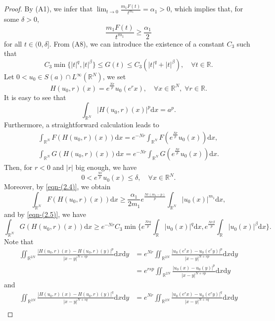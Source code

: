 \documentclass[10pt,a4paper]{amsart}
\numberwithin{equation}{section}
\begin{document}
\begin{proof}
By {\rm (A1)}, we infer that $\lim_{t\to 0}\frac{m_1F(t)}{t^{m_1}}=\alpha_1>0$,
which implies that, for some $\delta>0$,
\begin{equation}
\label{eqn-(2.4)}
\frac{m_1F(t)}{t^{m_1}}\ge\frac{\alpha_1}{2}
\end{equation}
for all $t\in(0,\delta]$.
From (A8), we can introduce the existence of a constant $C_3$ such that
\begin{equation}\label{eqn-(2.5)}
C_{3}\min\{|t|^{q},|t|^{\beta}\}\le G(t)\le C_{3}(|t|^{q}+|t|^{\beta}),\quad 
\forall t\in\mathbb{R}.
\end{equation}
Let $0<u_0\in S(a)\cap L^{\infty}(\mathbb{R}^N)$, we set
$$
H(u_0,r)(x)=e^{\frac{Nr}{p}}u_0(e^{r}x),\quad\forall x \in \mathbb{R}^N,\;
\forall r\in\mathbb{R}.
$$
It is easy to see that
$$
\int_{\mathbb{R}^{N}}|H(u_0,r)(x)|^{p}\mathrm{d}x=a^{p}.
$$
Furthermore, a straightforward calculation leads to
\begin{gather*}
\int_{\mathbb{R}^{N}} F(H(u_0,r)(x))\mathrm{d}x
=e^{-Nr}\int_{\mathbb{R}^{N}}F(e^{\frac{Nr}{p}}u_0(x))\mathrm{d}x, \\
\int_{\mathbb{R}^{N}} G(H(u_0,r)(x))\mathrm{d}x
=e^{-Nr}\int_{\mathbb{R}^{N}}G(e^{\frac{Nr}{p}}u_0(x))\mathrm{d}x.
\end{gather*}
Then, for $r<0$ and $|r|$ big enough, we have
$$0< e^{\frac{Nr}{p}}u_0(x)\le\delta,\quad\forall x\in\mathbb{R}^N.$$
Moreover, by \eqref{eqn-(2.4)}, we obtain
$$\int_{\mathbb{R}^{N}}F(H(u_0,r)(x))\mathrm{d}x\ge\frac{\alpha_1}{2m_1}e^{\frac{Nr(m_1-p)}{p}}\int_{\mathbb{R}^N}|u_0(x)|^{m_1}\mathrm{d}x,$$
and by \eqref{eqn-(2.5)}, we have
$$
\int_{\mathbb{R}^{N}}G(H(u_0,r)(x))\mathrm{d}x
\ge e^{-Nr}C_{3}\min\{e^{\frac{Nrq}{p}}
\int_{\mathbb{R}}|u_0(x)|^{q}\mathrm{d}x,e^{\frac{Nr\beta}{p}}
\int_{\mathbb{R}}|u_0(x)|^{\beta}\mathrm{d}x\}.
$$
Note that
\begin{align*}
\iint_{\mathbb{R}^{2N}}\frac{|H(u_0,r)(x)-H(u_0,r)(y)|^p}{|x-y|^{N+sp}}
 \mathrm{d}x\mathrm{d}y
&=e^{Nr}\iint_{\mathbb{R}^{2N}}\frac{|u_0(e^{r}x)-u_0(e^{r}y)|^{p}}{|x-y|^{N+sp}}
 \mathrm{d}x\mathrm{d}y\\
&=e^{rsp}\iint_{\mathbb{R}^{2N}}\frac{|u_0(x)-u_0(y)|^{p}}{|x-y|^{N+sp}}
 \mathrm{d}x\mathrm{d}y
\end{align*}
and
\begin{align*}
\iint_{\mathbb{R}^{2N}}\frac{|H(u_0,r)(x)-H(u_0,r)(y)|^q}{|x-y|^{N+sq}}
 \mathrm{d}x\mathrm{d}y
&=e^{Nr}\iint_{\mathbb{R}^{2N}}\frac{|u_0(e^{r}x)-u_0(e^{r}y)|^{q}}{|x-y|^{N+sq}}
 \mathrm{d}x\mathrm{d}y\\

\end{align*}
\end{proof}
\end{document}
